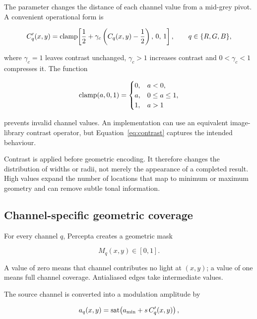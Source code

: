 The  parameter changes the distance of each channel value from a mid-grey pivot. A convenient operational form is

\begin{equation}
C'_q(x,y)=\operatorname{clamp}\!\left[
\frac{1}{2}+\gamma_c\left(C_q(x,y)-\frac{1}{2}\right),\,0,\,1
\right],
\qquad q\in\{R,G,B\},
\label{eq:contrast}
\end{equation}

where $\gamma_c=1$ leaves contrast unchanged, $\gamma_c>1$ increases contrast and $0<\gamma_c<1$ compresses it. The function

\begin{equation}
\operatorname{clamp}(a,0,1)=
\begin{cases}
0,&a<0,\\
a,&0\le a\le 1,\\
1,&a>1
\end{cases}
\end{equation}

prevents invalid channel values. An implementation can use an equivalent image-library contrast operator, but Equation~\eqref{eq:contrast} captures the intended behaviour.

Contrast is applied before geometric encoding. It therefore changes the distribution of widths or radii, not merely the appearance of a completed result. High values expand the number of locations that map to minimum or maximum geometry and can remove subtle tonal information.

\subsection{Channel-specific geometric coverage}

For every channel $q$, Percepta creates a geometric mask

\begin{equation}
M_q(x,y)\in[0,1].
\end{equation}

A value of zero means that channel contributes no light at $(x,y)$; a value of one means full channel coverage. Antialiased edges take intermediate values.

The source channel is converted into a modulation amplitude by

\begin{equation}
a_q(x,y)=\operatorname{sat}\!\left(a_{\min}+s\,C'_q(x,y)\right),
\label{eq:amplitude}
\end{equation}

